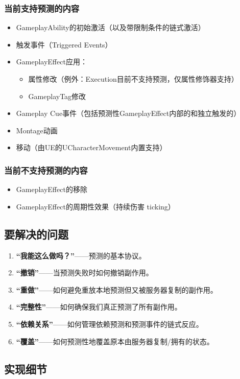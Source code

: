 \documentclass[10pt,CJKmath]{ctexart}
\begin{document}
\subsubsection{当前支持预测的内容}
\begin{itemize}
	\item GameplayAbility的初始激活（以及带限制条件的链式激活）
	\item 触发事件（Triggered Events）
	\item GameplayEffect应用：
	\begin{itemize}
		\item 属性修改（例外：Execution目前不支持预测，仅属性修饰器支持）
		\item GameplayTag修改
	\end{itemize}
	\item Gameplay Cue事件（包括预测性GameplayEffect内部的和独立触发的）
	\item Montage动画
	\item 移动（由UE的UCharacterMovement内置支持）
\end{itemize}

\subsubsection{当前不支持预测的内容}
\begin{itemize}
	\item GameplayEffect的移除
	\item GameplayEffect的周期性效果（持续伤害 ticking）
\end{itemize}

\subsection{要解决的问题}
\begin{enumerate}
	\item \textbf{“我能这么做吗？”}——预测的基本协议。
	\item \textbf{“撤销”}——当预测失败时如何撤销副作用。
	\item \textbf{“重做”}——如何避免重放本地预测但又被服务器复制的副作用。
	\item \textbf{“完整性”}——如何确保我们真正预测了所有副作用。
	\item \textbf{“依赖关系”}——如何管理依赖预测和预测事件的链式反应。
	\item \textbf{“覆盖”}——如何预测性地覆盖原本由服务器复制/拥有的状态。
\end{enumerate}

\subsection{实现细节}
\end{document}
